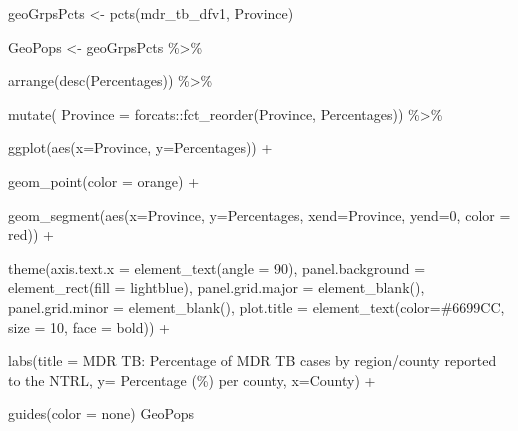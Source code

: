 \documentclass[
]{report}
\newenvironment{Shaded}{\begin{snugshade}}{\end{snugshade}}
\newcommand{\AttributeTok}[1]{\textcolor[rgb]{0.40,0.45,0.13}{#1}}
\newcommand{\DecValTok}[1]{\textcolor[rgb]{0.68,0.00,0.00}{#1}}
\newcommand{\FunctionTok}[1]{\textcolor[rgb]{0.28,0.35,0.67}{#1}}
\newcommand{\NormalTok}[1]{\textcolor[rgb]{0.00,0.23,0.31}{#1}}
\newcommand{\OtherTok}[1]{\textcolor[rgb]{0.00,0.23,0.31}{#1}}
\newcommand{\SpecialCharTok}[1]{\textcolor[rgb]{0.37,0.37,0.37}{#1}}
\newcommand{\StringTok}[1]{\textcolor[rgb]{0.13,0.47,0.30}{#1}}
\begin{document}
\begin{Shaded}
\begin{Highlighting}[]
\NormalTok{geoGrpsPcts }\OtherTok{\textless{}{-}} \FunctionTok{pcts}\NormalTok{(mdr\_tb\_dfv1, }\StringTok{\textquotesingle{}Province\textquotesingle{}}\NormalTok{)}

\NormalTok{GeoPops }\OtherTok{\textless{}{-}}\NormalTok{ geoGrpsPcts }\SpecialCharTok{\%\textgreater{}\%}

  \FunctionTok{arrange}\NormalTok{(}\FunctionTok{desc}\NormalTok{(Percentages)) }\SpecialCharTok{\%\textgreater{}\%} 

  \FunctionTok{mutate}\NormalTok{( }\AttributeTok{Province =}\NormalTok{ forcats}\SpecialCharTok{::}\FunctionTok{fct\_reorder}\NormalTok{(Province, Percentages)) }\SpecialCharTok{\%\textgreater{}\%}

  \FunctionTok{ggplot}\NormalTok{(}\FunctionTok{aes}\NormalTok{(}\AttributeTok{x=}\NormalTok{Province, }\AttributeTok{y=}\NormalTok{Percentages)) }\SpecialCharTok{+}

  \FunctionTok{geom\_point}\NormalTok{(}\AttributeTok{color =} \StringTok{\textquotesingle{}orange\textquotesingle{}}\NormalTok{) }\SpecialCharTok{+}

  \FunctionTok{geom\_segment}\NormalTok{(}\FunctionTok{aes}\NormalTok{(}\AttributeTok{x=}\NormalTok{Province, }\AttributeTok{y=}\NormalTok{Percentages, }\AttributeTok{xend=}\NormalTok{Province, }\AttributeTok{yend=}\DecValTok{0}\NormalTok{, }\AttributeTok{color =} \StringTok{\textquotesingle{}red\textquotesingle{}}\NormalTok{)) }\SpecialCharTok{+}

  \FunctionTok{theme}\NormalTok{(}\AttributeTok{axis.text.x =} \FunctionTok{element\_text}\NormalTok{(}\AttributeTok{angle =} \DecValTok{90}\NormalTok{), }\AttributeTok{panel.background =} \FunctionTok{element\_rect}\NormalTok{(}\AttributeTok{fill =} \StringTok{\textquotesingle{}lightblue\textquotesingle{}}\NormalTok{), }\AttributeTok{panel.grid.major =} \FunctionTok{element\_blank}\NormalTok{(), }\AttributeTok{panel.grid.minor =} \FunctionTok{element\_blank}\NormalTok{(), }\AttributeTok{plot.title =} \FunctionTok{element\_text}\NormalTok{(}\AttributeTok{color=}\StringTok{\textquotesingle{}\#6699CC\textquotesingle{}}\NormalTok{, }\AttributeTok{size =} \DecValTok{10}\NormalTok{, }\AttributeTok{face =} \StringTok{\textquotesingle{}bold\textquotesingle{}}\NormalTok{)) }\SpecialCharTok{+}

  \FunctionTok{labs}\NormalTok{(}\AttributeTok{title =} \StringTok{\textquotesingle{}MDR TB: Percentage of MDR TB cases by region/county reported to the NTRL\textquotesingle{}}\NormalTok{, }\AttributeTok{y=} \StringTok{\textquotesingle{}Percentage (\%) per county\textquotesingle{}}\NormalTok{, }\AttributeTok{x=}\StringTok{\textquotesingle{}County\textquotesingle{}}\NormalTok{) }\SpecialCharTok{+}

  \FunctionTok{guides}\NormalTok{(}\AttributeTok{color =} \StringTok{\textquotesingle{}none\textquotesingle{}}\NormalTok{)}
\NormalTok{GeoPops }
\end{Highlighting}
\end{Shaded}
\end{document}
